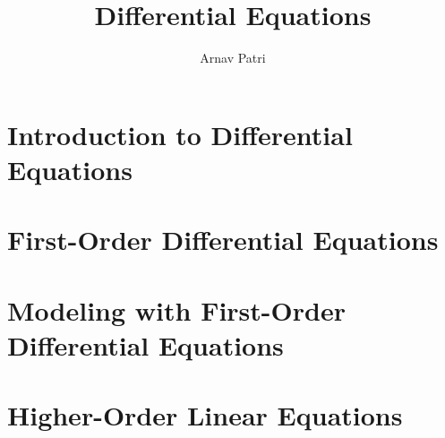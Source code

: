 \documentclass[12pt, A4]{report}
\title{Differential Equations}
\author{Arnav Patri}
\begin{document}
	\maketitle
	\tableofcontents
	\chapter{Introduction to Differential Equations}
		
	\chapter{First-Order Differential Equations}
		
	\chapter{Modeling with First-Order Differential Equations}
		
	\chapter{Higher-Order Linear Equations}
		
\end{document}
